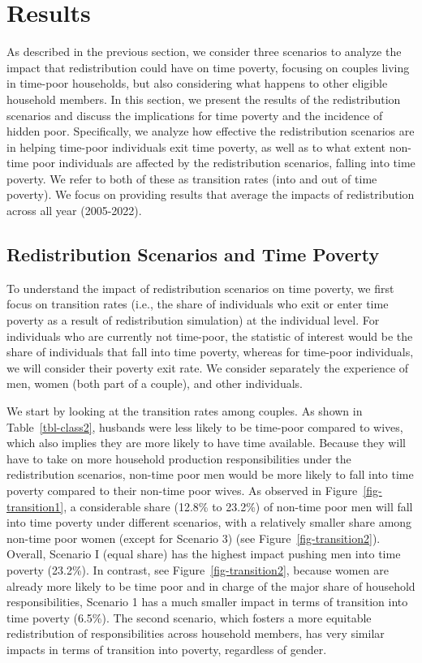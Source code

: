 \documentclass[
  11pt,
]{article}
\begin{document}
\section{Results}\label{results}

As described in the previous section, we consider three scenarios to
analyze the impact that redistribution could have on time poverty,
focusing on couples living in time-poor households, but also considering
what happens to other eligible household members. In this section, we
present the results of the redistribution scenarios and discuss the
implications for time poverty and the incidence of hidden poor.
Specifically, we analyze how effective the redistribution scenarios are
in helping time-poor individuals exit time poverty, as well as to what
extent non-time poor individuals are affected by the redistribution
scenarios, falling into time poverty. We refer to both of these as
transition rates (into and out of time poverty). We focus on providing
results that average the impacts of redistribution across all year
(2005-2022).

\subsection{Redistribution Scenarios and Time
Poverty}\label{redistribution-scenarios-and-time-poverty}

To understand the impact of redistribution scenarios on time poverty, we
first focus on transition rates (i.e., the share of individuals who exit
or enter time poverty as a result of redistribution simulation) at the
individual level. For individuals who are currently not time-poor, the
statistic of interest would be the share of individuals that fall into
time poverty, whereas for time-poor individuals, we will consider their
poverty exit rate. We consider separately the experience of men, women
(both part of a couple), and other individuals.

We start by looking at the transition rates among couples. As shown in
Table~\ref{tbl-class2}, husbands were less likely to be time-poor
compared to wives, which also implies they are more likely to have time
available. Because they will have to take on more household production
responsibilities under the redistribution scenarios, non-time poor men
would be more likely to fall into time poverty compared to their
non-time poor wives. As observed in Figure~\ref{fig-transition1}, a
considerable share (12.8\% to 23.2\%) of non-time poor men will fall
into time poverty under different scenarios, with a relatively smaller
share among non-time poor women (except for Scenario 3) (see
Figure~\ref{fig-transition2}). Overall, Scenario I (equal share) has the
highest impact pushing men into time poverty (23.2\%). In contrast, see
Figure~\ref{fig-transition2}, because women are already more likely to
be time poor and in charge of the major share of household
responsibilities, Scenario 1 has a much smaller impact in terms of
transition into time poverty (6.5\%). The second scenario, which fosters
a more equitable redistribution of responsibilities across household
members, has very similar impacts in terms of transition into poverty,
regardless of gender.
\end{document}
